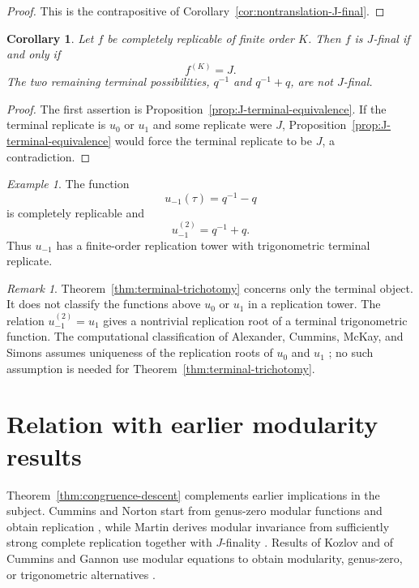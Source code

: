 \documentclass[12pt]{amsart}
\newtheorem{cor}[thm]{Corollary}
\theoremstyle{definition}
\theoremstyle{remark}
\newtheorem{remark}[thm]{Remark}
\newtheorem{example}[thm]{Example}
\numberwithin{equation}{section}
\begin{document}
\begin{proof}
This is the contrapositive of Corollary~\ref{cor:nontranslation-J-final}.
\end{proof}

\begin{cor}\label{cor:terminal-characterization}
Let $f$ be completely replicable of finite order $K$. Then $f$ is $J$-final if and only if
\[
f^{(K)}=J.
\]
The two remaining terminal possibilities, $q^{-1}$ and $q^{-1}+q$, are not $J$-final.
\end{cor}

\begin{proof}
The first assertion is Proposition~\ref{prop:J-terminal-equivalence}. If the terminal replicate is $u_0$ or $u_1$ and some replicate were $J$, Proposition~\ref{prop:J-terminal-equivalence} would force the terminal replicate to be $J$, a contradiction.
\end{proof}

\begin{example}\label{ex:minus}
The function
\[
u_{-1}(\tau)=q^{-1}-q
\]
is completely replicable and
\[
u_{-1}^{(2)}=q^{-1}+q.
\]
Thus $u_{-1}$ has a finite-order replication tower with trigonometric terminal replicate.
\end{example}

\begin{remark}\label{rem:replication-roots}
Theorem~\ref{thm:terminal-trichotomy} concerns only the terminal object. It does not classify the functions above $u_0$ or $u_1$ in a replication tower. The relation $u_{-1}^{(2)}=u_1$ gives a nontrivial replication root of a terminal trigonometric function. The computational classification of Alexander, Cummins, McKay, and Simons assumes uniqueness of the replication roots of $u_0$ and $u_1$ \cite{alexander-cummins-mckay-simons}; no such assumption is needed for Theorem~\ref{thm:terminal-trichotomy}.
\end{remark}

\section{Relation with earlier modularity results}

Theorem~\ref{thm:congruence-descent} complements earlier implications in the subject. Cummins and Norton start from genus-zero modular functions and obtain replication \cite{cummins-norton}, while Martin derives modular invariance from sufficiently strong complete replication together with $J$-finality \cite{martin}. Results of Kozlov and of Cummins and Gannon use modular equations to obtain modularity, genus-zero, or trigonometric alternatives \cite{kozlov,cummins-gannon}.
\end{document}
